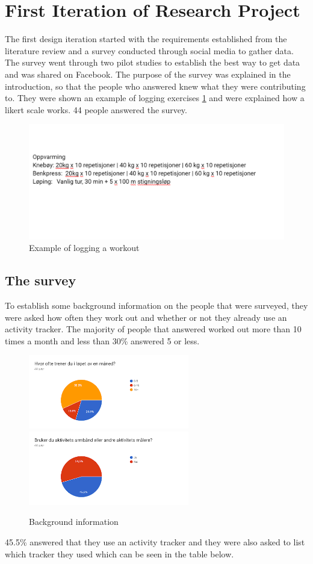 \section{First Iteration of Research Project}
The first design iteration started with the requirements established from the literature review and a survey conducted through social media to gather data. The survey went through two pilot studies to establish the best way to get data and was shared on Facebook. The purpose of the survey was explained in the introduction, so that the people who answered knew what they were contributing to. They were shown an example of logging exercises \ref{fig:workout log} and were explained how a likert scale works. 44 people answered the survey.
\begin{figure}[H]
    \centering
    \includegraphics[width=120mm]{figures/testtest.png}
    \caption{Example of logging a workout}
    \label{fig:workout log}
\end{figure}
\subsection{The survey}
To establish some background information on the people that were surveyed, they were asked how often they work out and whether or not they already use an activity tracker. The majority of people that answered worked out more than 10 times a month and less than 30\% answered 5 or less.
\begin{figure}[H]%
    \centering
    {{\includegraphics[width=7cm]{figures/testings.png} }}%
    \qquad
     {{\includegraphics[width=7cm]{figures/survey2.png} }}%
    \caption{Background information}%
\end{figure}
45.5\% answered that they use an activity tracker and they were also asked to list which tracker they used which can be seen in the table below. 

